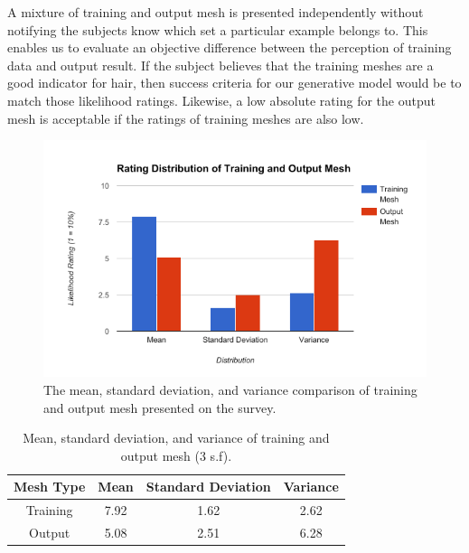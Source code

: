 \documentclass[ %
author={Dillon Keith Diep},
supervisor={Dr. Carl Henrik Ek},
degree={MEng},
title={ART-CG Hair:},
subtitle={Assisted Real-time Content Generation of Stylised Virtual Hair},
type={Research},
year={2017} ]{dissertation}
\begin{document}
A mixture of training and output mesh is presented independently without notifying the subjects know which set a particular example belongs to. This enables us to evaluate an objective difference between the perception of training data and output result. If the subject believes that the training meshes are a good indicator for hair, then success criteria for our generative model would be to match those likelihood ratings. Likewise, a low absolute rating for the output mesh is acceptable if the ratings of training meshes are also low.

\begin{figure}[!h]
	\centering
	\includegraphics[scale=0.6]{images/meshRating}
	\caption{The mean, standard deviation, and variance comparison of training and output mesh presented on the survey.}
\end{figure}

\begin{table}[!h]
	\centering
	\begin{tabular}{|c|c|c|c|}
		\hline
		Mesh Type 	& Mean		& Standard Deviation	& Variance\\
		\hline
		Training 	& 7.92      & 1.62      			& 2.62\\
		\hline
		Output 		& 5.08 		& 2.51 					& 6.28 \\
		\hline
	\end{tabular}
	\caption{Mean, standard deviation, and variance of training and output mesh (3 s.f).}
\end{table}
\end{document}
